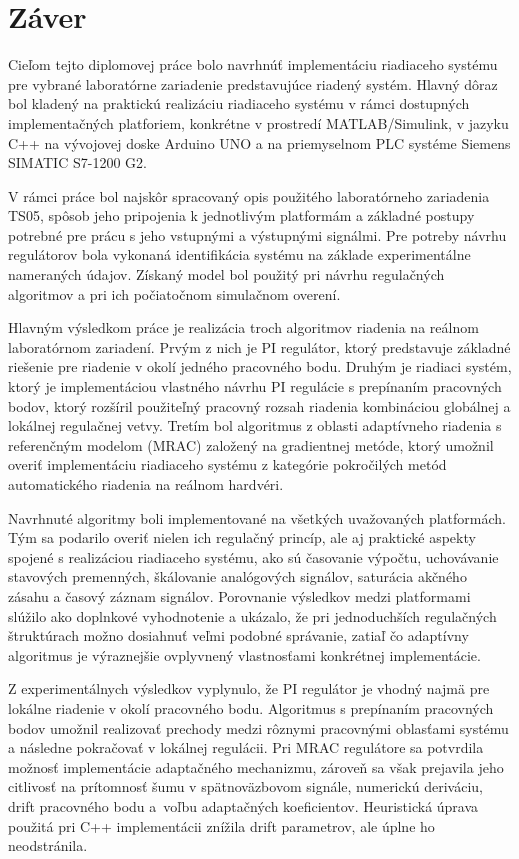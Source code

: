 \section*{Záver}



Cieľom tejto diplomovej práce bolo navrhnúť implementáciu riadiaceho systému pre vybrané laboratórne zariadenie predstavujúce riadený systém.
Hlavný dôraz bol kladený na praktickú realizáciu riadiaceho systému v rámci dostupných
implementačných platforiem, konkrétne v prostredí MATLAB/Simulink, v jazyku
C++ na vývojovej doske Arduino UNO a na priemyselnom PLC systéme Siemens
SIMATIC S7-1200 G2.

V rámci práce bol najskôr spracovaný opis použitého laboratórneho zariadenia TS05,
spôsob jeho pripojenia k jednotlivým platformám a základné postupy potrebné
pre prácu s jeho vstupnými a výstupnými signálmi. Pre potreby návrhu regulátorov
bola vykonaná identifikácia systému na základe experimentálne nameraných údajov.
Získaný model bol použitý pri návrhu regulačných algoritmov a pri ich počiatočnom
simulačnom overení.

Hlavným výsledkom práce je realizácia troch algoritmov riadenia na reálnom
laboratórnom zariadení. Prvým z nich je PI regulátor, ktorý predstavuje
základné riešenie pre riadenie v okolí jedného pracovného bodu. Druhým je riadiaci systém, ktorý je implementáciou vlastného návrhu PI regulácie s prepínaním pracovných bodov, ktorý
rozšíril použiteľný pracovný rozsah riadenia kombináciou globálnej a lokálnej
regulačnej vetvy. Tretím bol algoritmus z oblasti adaptívneho riadenia s referenčným modelom (MRAC) založený na gradientnej
metóde, ktorý umožnil overiť implementáciu riadiaceho systému z kategórie pokročilých metód automatického riadenia na reálnom hardvéri.

Navrhnuté algoritmy boli implementované na všetkých uvažovaných platformách.
Tým sa podarilo overiť nielen ich regulačný princíp, ale aj praktické aspekty
spojené s realizáciou riadiaceho systému, ako sú časovanie výpočtu, uchovávanie
stavových premenných, škálovanie analógových signálov, saturácia akčného zásahu
a časový záznam signálov. Porovnanie výsledkov medzi platformami
slúžilo ako doplnkové vyhodnotenie a ukázalo, že pri jednoduchších regulačných
štruktúrach možno dosiahnuť veľmi podobné správanie, zatiaľ čo adaptívny
algoritmus je výraznejšie ovplyvnený vlastnosťami konkrétnej implementácie.

Z experimentálnych výsledkov vyplynulo, že PI regulátor je vhodný najmä pre
lokálne riadenie v okolí pracovného bodu. Algoritmus s prepínaním pracovných
bodov umožnil realizovať prechody medzi rôznymi pracovnými oblasťami systému
a následne pokračovať v lokálnej regulácii. Pri MRAC regulátore sa potvrdila
možnosť implementácie adaptačného mechanizmu, zároveň sa však prejavila jeho
citlivosť na prítomnosť šumu v spätnoväzbovom signále, numerickú deriváciu, drift pracovného bodu a~voľbu
adaptačných koeficientov. Heuristická úprava použitá pri C++ implementácii
znížila drift parametrov, ale úplne ho neodstránila.

